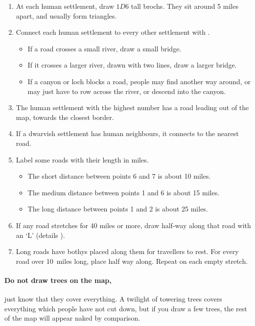 \begin{multicols}{2}
\begin{enumerate}
  \item
  At each human settlement, draw $1D6$ tall \glspl{broch}.
  They sit around 5 miles apart, and usually form triangles.
  \item
  Connect each human settlement to every other settlement with .
  \begin{itemize}
    \item
    If a road crosses a small river, draw a small bridge.
    \item
    If it crosses a larger river, drawn with two lines, draw a larger bridge.
    \item
    If a canyon or loch blocks a road, people may find another way around, or may just have to row across the river, or descend into the canyon.
  \end{itemize}
  \item
  The human settlement with the highest number has a road leading out of the map, towards the closest border.
  \label{roadOut}
  \item
  If a dwarvish settlement has human neighbours, it connects to the nearest road.
  \item
  Label some roads with their length in miles.
  \begin{itemize}
    \item
    The short distance between points 6 and 7 is about 10 miles.
    \item
    The medium distance between points 1 and 6 is about 15 miles.
    \item
    The long distance between points 1 and 2 is about 25 miles.
  \end{itemize}
  \item
  If any road stretches for 40 miles or more, draw  half-way along that road with an `L' (details ).
  \item
  Long roads have \glspl{bothy} placed along them for travellers to rest.
  \label{bothyRolls}
  For every road over 10~miles long, place  half way along.
  Repeat on each empty stretch.
\end{enumerate}

\bigLine

\paragraph{Do not draw trees on the map,}
just know that they cover everything.
A twilight of towering trees covers everything which people have not cut down, but if you draw a few trees, the rest of the map will appear naked by comparison.


\end{multicols}
